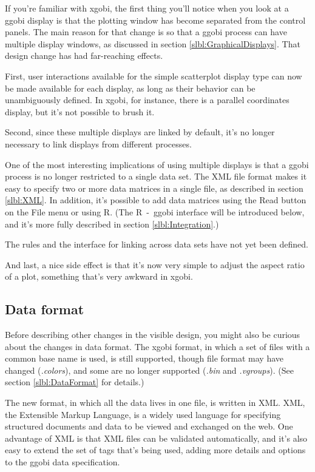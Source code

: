 \documentclass[11pt]{article}
\begin{document}
If you're familiar with xgobi, the first thing you'll notice
when you look at a ggobi display is that the plotting window
has become separated from the control panels.  The main reason
for that change is so that a ggobi process can have multiple
display windows, as discussed in section
\ref{slbl:GraphicalDisplays}.   That design change has had
far-reaching effects.

First, user interactions available for the simple scatterplot display
type can now be made available for each display, as long as their
behavior can be unambiguously defined.  In xgobi, for instance, there
is a parallel coordinates display, but it's not possible to brush
it.

Second, since these multiple displays are linked by default, it's no
longer necessary to link displays from different processes.

One of the most interesting implications of using multiple displays
is that a ggobi process is no longer restricted to a single data
set.  The XML file format makes it easy to specify two or more data
matrices in a single file, as described in section \ref{slbl:XML}.
In addition, it's possible to add data matrices using the Read button
on the File menu or using R.  (The R~-~ggobi interface will be
introduced below, and it's more fully described in section
\ref{slbl:Integration}.)

The rules and the interface for linking across data sets have not yet
been defined.

And last, a nice side effect is that it's now very simple to
adjust the aspect ratio of a plot, something that's very awkward in
xgobi.

\subsection {Data format}

Before describing other changes in the visible design, you might
also be curious about the changes in data format.  The xgobi
format, in which a set of files with a common base name is used,
is still supported, though file format may have changed ({\em .colors}),
and some are no longer supported ({\em .bin} and {\em .vgroups}).
(See section \ref{slbl:DataFormat} for details.)

The new format, in which all the data lives in one file, is written
in XML.  XML, the Extensible Markup Language, is a widely used
language for specifying structured documents and data to
be viewed and exchanged on the web.  One advantage of XML is
that XML files can be validated automatically, and it's also
easy to extend the set of tags that's being used, adding more
details and options to the ggobi data specification.
\end{document}
